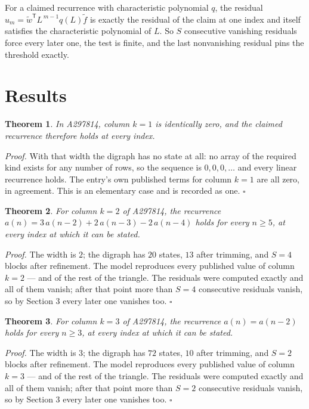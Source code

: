 \documentclass[11pt]{article}
\newtheorem{theorem}{Theorem}
\theoremstyle{definition}
\begin{document}
For a claimed recurrence with characteristic polynomial $q$, the residual $u_m = \tilde w^{\mathsf T}L^{\,m-1}q(L)\tilde f$ is exactly the residual of the claim at one index and itself satisfies the characteristic polynomial of $L$. So $S$ consecutive vanishing residuals force every later one, the test is finite, and the last nonvanishing residual pins the threshold exactly.

\section{Results}

\begin{theorem} In A297814, column $k = 1$ is identically zero, and the claimed recurrence therefore holds at every index.\end{theorem}

{\itshape Proof.} With that width the digraph has no state at all: no array of the required kind exists for any number of rows, so the sequence is $0,0,0,\dots$ and every linear recurrence holds. The entry's own published terms for column $k = 1$ are all zero, in agreement. This is an elementary case and is recorded as one. $\square$

\begin{theorem} For column $k = 2$ of A297814, the recurrence $a(n) = 3\,a(n-2) + 2\,a(n-3) - 2\,a(n-4)$ holds for every $n \ge 5$, at every index at which it can be stated.\end{theorem}

{\itshape Proof.} The width is $2$; the digraph has $20$ states, $13$ after trimming, and $S = 4$ blocks after refinement. The model reproduces every published value of column $k = 2$ --- and of the rest of the triangle. The residuals were computed exactly and all of them vanish; after that point more than $S = 4$ consecutive residuals vanish, so by Section 3 every later one vanishes too. $\square$

\begin{theorem} For column $k = 3$ of A297814, the recurrence $a(n) = a(n-2)$ holds for every $n \ge 3$, at every index at which it can be stated.\end{theorem}

{\itshape Proof.} The width is $3$; the digraph has $72$ states, $10$ after trimming, and $S = 2$ blocks after refinement. The model reproduces every published value of column $k = 3$ --- and of the rest of the triangle. The residuals were computed exactly and all of them vanish; after that point more than $S = 2$ consecutive residuals vanish, so by Section 3 every later one vanishes too. $\square$
\end{document}
